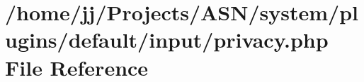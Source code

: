 \hypertarget{system_2plugins_2default_2input_2privacy_8php}{}\section{/home/jj/\+Projects/\+A\+S\+N/system/plugins/default/input/privacy.php File Reference}
\label{system_2plugins_2default_2input_2privacy_8php}
